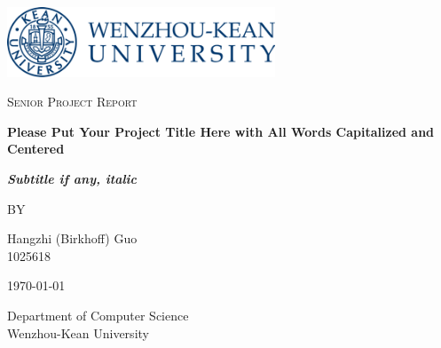 \begin{titlepage} %
    \centering
    \includegraphics[width=0.6\textwidth]{images/wku.png}\par

    {\scshape\Huge Senior Project Report\par}
    \vspace{0.5cm}
    
    {\huge\bfseries Please Put Your Project Title Here with All Words Capitalized and Centered \par}
    \vspace{0.5cm}
    {\LARGE\itshape\bfseries Subtitle if any, italic\par}
    \vspace{1.5cm}
    
    BY
    
    {\large Hangzhi (Birkhoff) Guo\\1025618\par}

    \vfill

    {\large \today}

    \vspace{1cm}

    {\large Department of Computer Science\\
    Wenzhou-Kean University\\
    \par}

\end{titlepage}
